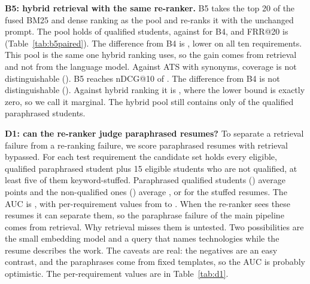 \documentclass[conference]{IEEEtran}
\begin{document}
\textbf{B5: hybrid retrieval with the same re-ranker.} B5 takes the top 20 of the fused BM25 and dense ranking as the pool and re-ranks it with the unchanged prompt. The pool holds \PoolBFiveTwenty{} of \PoolQualifiedTotal{} qualified students, against \PoolPropTwenty{} for B4, and FRR@20 is \BFiveTestFrrtwentyCi{} (Table~\ref{tab:b5paired}). The difference from B4 is \BFiveVsPropFrrtwentyDiffCi{}, lower on all ten requirements. This pool is the same one hybrid ranking uses, so the gain comes from retrieval and not from the language model. Against ATS with synonyms, coverage is not distinguishable (\BFiveVsAtsSynFrrtwentyDiffCi{}). B5 reaches nDCG@10 of \BFiveTestNdcgCi{}. The difference from B4 is not distinguishable (\BFiveVsPropNdcgDiffCi{}). Against hybrid ranking it is \BFiveVsHybridNdcgDiffCi{}, where the lower bound is exactly zero, so we call it marginal. The hybrid pool still contains only \PoolBFiveParaphrasedFound{} of the \ArchParaphrasedQualified{} qualified paraphrased students.

\textbf{D1: can the re-ranker judge paraphrased resumes?} To separate a retrieval failure from a re-ranking failure, we score paraphrased resumes with retrieval bypassed. For each test requirement the candidate set holds every eligible, qualified paraphrased student plus 15 eligible students who are not qualified, at least five of them keyword-stuffed. Paraphrased qualified students (\DOneNPositive{}) average \DOnePosScore{} points and the non-qualified ones (\DOneNNegative{}) average \DOneNegScore{}, or \DOneStuffedScore{} for the stuffed resumes. The AUC is \DOneAucCi{}, with per-requirement values from \DOneAucMin{} to \DOneAucMax{}. When the re-ranker sees these resumes it can separate them, so the paraphrase failure of the main pipeline comes from retrieval. Why retrieval misses them is untested. Two possibilities are the small embedding model and a query that names technologies while the resume describes the work. The caveats are real: the negatives are an easy contrast, and the paraphrases come from fixed templates, so the AUC is probably optimistic. The per-requirement values are in Table~\ref{tab:d1}.

\begin{table}[t]
\caption{Post-hoc exploratory: paired differences of B5 (hybrid retrieval plus the same re-ranker) against B4, B3b and B1c on the test requirements. W/L/T counts requirements where B5 is better: higher for nDCG and Recall, lower for FRR@20.}
\label{tab:b5paired}
\centering\scriptsize
\resizebox{\columnwidth}{!}{}
\end{table}
\end{document}
